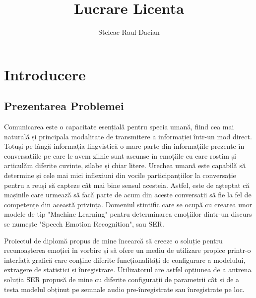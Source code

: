 \documentclass[a4paper,12pt]{book}
\title{Lucrare Licenta}
\author{Steleac Raul-Dacian}
\begin{document}
	
	\clearpage
	\thispagestyle{empty}
	\tableofcontents
	\thispagestyle{empty}
	\clearpage
	\newpage 
	\thispagestyle{empty}
	
	\chapter{Introducere}
	
		\section{Prezentarea Problemei}
						
			\setlength{\parindent}{0.8cm}
			
			Comunicarea este o capacitate esențială pentru specia umană, fiind cea mai naturală și principala modalitate de transmitere a informației într-un mod direct. Totuși pe lângă informația lingvistică o mare parte din informațiile prezente în conversațiile pe care le avem zilnic sunt ascunse în emoțiile cu care rostim și articulăm diferite cuvinte, silabe și chiar litere. Urechea umană este capabilă să determine și cele mai mici inflexiuni din vocile participanțiilor la conversație pentru a reuși să capteze cât mai bine sensul acesteia. Astfel, este de așteptat că mașinile care urmează să facă parte de acum din aceste conversații să fie la fel de competențe din această privința. Domeniul stintific care se ocupă cu crearea unor modele de tip "Machine Learning" pentru determinarea emoțiilor dintr-un discurs se numește "Speech Emotion Recognition", sau SER. \par
			
			Proiectul de diplomă propus de mine încearcă să creeze o soluție pentru recunoașterea emoției în vorbire și să ofere un mediu de utilizare propice printr-o interfață grafică care conține diferite funcționalități de configurare a modelului, extragere de statistici și înregistrare. Utilizatorul are astfel opțiunea de a antrena soluția SER propusă de mine cu diferite configurații de parametrii cât și de a testa modelul obținut pe semnale audio pre-înregistrate sau înregistrate pe loc.\par
			
\end{document}
